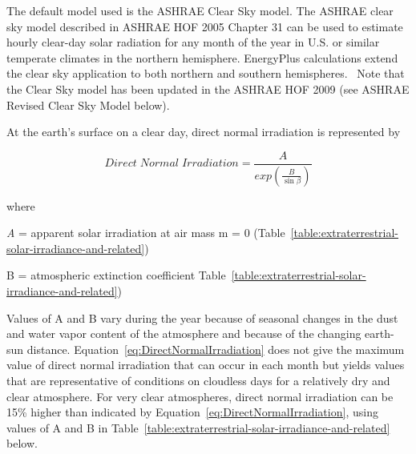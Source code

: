 The default model used is the ASHRAE Clear Sky model. The ASHRAE clear sky model described in ASHRAE HOF 2005 Chapter 31 can be used to estimate hourly clear-day solar radiation for any month of the year in U.S. or similar temperate climates in the northern hemisphere. EnergyPlus calculations extend the clear sky application to both northern and southern hemispheres.~ Note that the Clear Sky model has been updated in the ASHRAE HOF 2009 (see ASHRAE Revised Clear Sky Model below).

At the earth's surface on a clear day, direct normal irradiation is represented by

\begin{equation}
Direct\;Normal\;Irradiation = \frac{A}{exp\left( \frac{B}{\sin \beta } \right)}
\label{eq:DirectNormalIrradiation}
\end{equation}

where

\emph{A} = apparent solar irradiation at air mass m = 0 (Table~\ref{table:extraterrestrial-solar-irradiance-and-related})

B = atmospheric extinction coefficient Table~\ref{table:extraterrestrial-solar-irradiance-and-related})

Values of A and B vary during the year because of seasonal changes in the dust and water vapor content of the atmosphere and because of the changing earth-sun distance. Equation~\ref{eq:DirectNormalIrradiation} does not give the maximum value of direct normal irradiation that can occur in each month but yields values that are representative of conditions on cloudless days for a relatively dry and clear atmosphere. For very clear atmospheres, direct normal irradiation can be 15\% higher than indicated by Equation~\ref{eq:DirectNormalIrradiation}, using values of A and B in Table~\ref{table:extraterrestrial-solar-irradiance-and-related} below.

